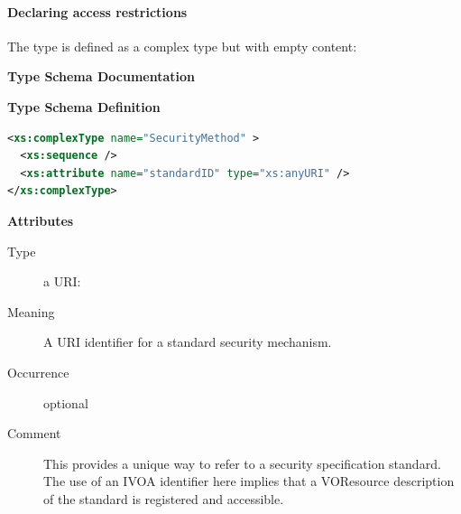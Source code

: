 \documentclass[11pt,a4paper]{ivoa}
\begin{document}


\paragraph{Declaring access restrictions}

The  type is
defined as a complex type but with empty content:


\begin{generated}
\begingroup
        \renewcommand*\descriptionlabel[1]{%
        \hbox to 5.5em{\emph{#1}\hfil}}\vspace{2ex}\noindent\textbf{ Type Schema Documentation}



\vspace{1ex}\noindent\textbf{ Type Schema Definition}

\begin{lstlisting}[language=XML,basicstyle=\footnotesize]
<xs:complexType name="SecurityMethod" >
  <xs:sequence />
  <xs:attribute name="standardID" type="xs:anyURI" />
</xs:complexType>
\end{lstlisting}

\vspace{0.5ex}\noindent\textbf{ Attributes}

\begingroup\small\begin{bigdescription}
\item[standardID]
\begin{description}
\item[Type] a URI: 
\item[Meaning]
               A URI identifier for a standard security mechanism.

\item[Occurrence] optional
\item[Comment]
               This provides a unique way to refer to a security
               specification standard.  The use of an IVOA identifier here
               implies that a VOResource description of the standard is
               registered and accessible.

\end{description}


\end{bigdescription}\endgroup

\endgroup
\end{generated}
\end{document}
